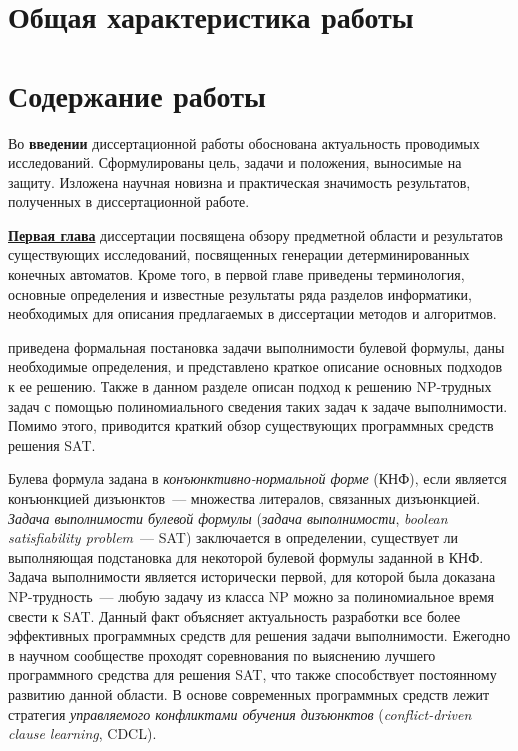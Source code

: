 
\section*{Общая характеристика работы} %



\newpage

\section*{Содержание работы}

Во \textbf{введении} диссертационной работы обоснована актуальность проводимых исследований. Сформулированы цель, задачи и положения, выносимые на защиту. Изложена научная новизна и практическая значимость результатов, полученных в диссертационной работе.


\textbf{\underline{Первая глава}} диссертации посвящена обзору предметной области и результатов существующих исследований, посвященных генерации детерминированных конечных автоматов.
Кроме того, в первой главе приведены терминология, основные определения и известные результаты ряда разделов информатики, необходимых для описания предлагаемых в диссертации методов и алгоритмов.

\insection{\ref{sec:review:sat}} приведена формальная постановка задачи выполнимости булевой формулы, даны необходимые определения, и представлено краткое описание основных подходов к ее решению.
Также в данном разделе описан подход к решению NP-трудных задач с помощью полиномиального сведения таких задач к задаче выполнимости.
Помимо этого, приводится краткий обзор существующих программных средств решения SAT.

Булева формула задана в \emph{конъюнктивно-нормальной форме} (КНФ), если является конъюнкцией дизъюнктов~--- множества литералов, связанных дизъюнкцией.
\emph{Задача выполнимости булевой формулы} (\emph{задача выполнимости}, \emph{boolean satisfiability problem}~{---} SAT) заключается в определении, существует ли выполняющая подстановка для некоторой булевой формулы заданной в КНФ.
Задача выполнимости является исторически первой, для которой была доказана NP-трудность~--- любую задачу из класса NP можно за полиномиальное время свести к SAT.
Данный факт объясняет актуальность разработки все более эффективных программных средств для решения задачи выполнимости.
Ежегодно в научном сообществе проходят соревнования по выяснению лучшего программного средства для решения SAT, что также способствует постоянному развитию данной области.
В основе современных программных средств лежит стратегия \emph{управляемого конфликтами обучения дизъюнктов} (\emph{conflict-driven clause learning}, CDCL).

